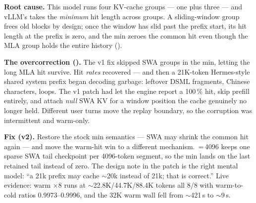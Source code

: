 \textbf{Root cause.} This model runs four KV-cache groups --- one
 plus three  --- and vLLM's
 takes the \emph{minimum}
hit length across groups. A sliding-window group frees old blocks by design;
once the window has slid past the prefix start, its hit length at the prefix
is zero, and the min zeroes the common hit even though the MLA group holds the
entire history ().

\textbf{The overcorrection ().} The v1 fix skipped SWA groups in
the min, letting the long MLA hit survive. Hit \emph{rates} recovered ---
and then a 21K-token Hermes-style shared system prefix began decoding garbage:
leftover DSML fragments, Chinese characters, loops. The v1 patch had let the
engine report a 100\,\% hit, skip prefill entirely, and attach \emph{null} SWA
KV for a window position the cache genuinely no longer held. Different user
turns move the replay boundary, so the corruption was intermittent and warm-only.

\textbf{Fix (v2).} Restore the stock min semantics --- SWA may shrink the
common hit again --- and move the warm-hit win to a different mechanism.
\,=\,4096 keeps one sparse SWA
tail checkpoint per 4096-token segment, so the min lands on the last retained
tail instead of zero. The design note in the patch is the right mental model:
``a 21k prefix may cache ${\sim}$20k instead of 21k; that is correct.'' Live
evidence: warm $\times$8 runs at ${\sim}$22.8K/44.7K/88.4K tokens all 8/8 with
warm-to-cold ratios 0.9973--0.9996, and the 32K warm wall fell from
${\sim}$421\,s to ${\sim}$9\,s.

